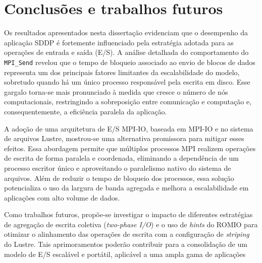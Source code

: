 \chapter{Conclusões e trabalhos futuros}
\label{cap:conclusao}

Os resultados apresentados nesta dissertação evidenciam que o desempenho
da aplicação SDDP é fortemente influenciado pela estratégia adotada para
as operações de entrada e saída (E/S). A análise detalhada do
comportamento do \texttt{MPI\_Send} revelou que o tempo de bloqueio
associado ao envio de blocos de dados representa um dos principais fatores
limitantes da escalabilidade do modelo, sobretudo quando há um único
processo responsável pela escrita em disco. Esse gargalo torna-se mais
pronunciado à medida que cresce o número de nós computacionais,
restringindo a sobreposição entre comunicação e computação e,
consequentemente, a eficiência paralela da aplicação.

A adoção de uma arquitetura de E/S MPI-IO, baseada em MPI-IO e
no sistema de arquivos Lustre, mostrou-se uma alternativa promissora
para mitigar esses efeitos. Essa abordagem permite que múltiplos
processos MPI realizem operações de escrita de forma paralela e
coordenada, eliminando a dependência de um processo escritor único e
aproveitando o paralelismo nativo do sistema de arquivos. Além de
reduzir o tempo de bloqueio dos processos, essa solução potencializa o
uso da largura de banda agregada e melhora a escalabilidade em
aplicações com alto volume de dados.

Como trabalhos futuros, propõe-se investigar o impacto de diferentes
estratégias de agregação de escrita coletiva (\textit{two-phase I/O}) e
o uso de \textit{hints} do ROMIO para otimizar o alinhamento das
operações de escrita com a configuração de \textit{striping} do Lustre.
Tais aprimoramentos poderão contribuir para a consolidação de um modelo
de E/S escalável e portátil, aplicável a uma ampla gama de aplicações
